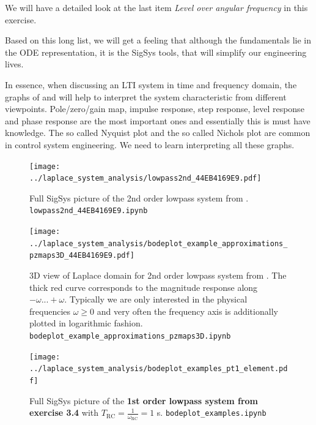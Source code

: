 We will have a detailed look at the last item \textit{Level over angular frequency}
in this exercise.

Based on this long list, we will get a feeling that although the fundamentals
lie in the ODE representation, it is the SigSys tools, that will simplify our
engineering lives.

\begin{mdframed}
In essence, when discussing an LTI system in time and frequency domain, the
graphs of  and 
will help to interpret the system characteristic from different viewpoints.
Pole/zero/gain map, impulse response, step response, level response and
phase response are the most important
ones and essentially this is must have knowledge.
The so called Nyquist plot and the so called Nichols plot are common in
control system engineering.
We need to learn interpreting all these graphs.
\end{mdframed}




\begin{figure}
  \texttt{[image: ../laplace\_system\_analysis/lowpass2nd\_44EB4169E9.pdf]}
  \caption{Full SigSys picture of the 2nd order lowpass system from
  . \texttt{lowpass2nd\_44EB4169E9.ipynb}}
  \label{fig:lowpass2nd_44EB4169E9}
\end{figure}


\begin{figure}
  \texttt{[image: ../laplace\_system\_analysis/bodeplot\_example\_approximations\_pzmaps3D\_44EB4169E9.pdf]}
  \caption{3D view of Laplace domain for 2nd order lowpass system from
  .
  The thick red curve corresponds to the magnitude response along $-\omega...+\omega$.
  Typically we are only interested in the physical frequencies $\omega\geq0$ and
  very often the frequency axis is additionally plotted in logarithmic fashion.
  \texttt{bodeplot\_example\_approximations\_pzmaps3D.ipynb}}
  \label{fig:bodeplot_example_approximations_pzmaps3D_44EB4169E9}
\end{figure}




\begin{figure}
  \texttt{[image: ../laplace\_system\_analysis/bodeplot\_examples\_pt1\_element.pdf]}
  \caption{Full SigSys picture of the \textbf{1st order lowpass system from
  exercise 3.4} with $T_\mathrm{RC} = \frac{1}{\omega_\mathrm{RC}} = 1$ s.
  \texttt{bodeplot\_examples.ipynb}}
  \label{fig:bodeplot_examples_pt1_element}
\end{figure}



